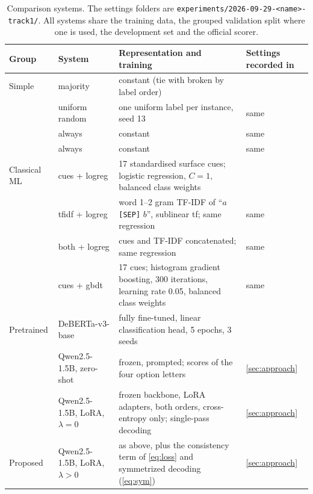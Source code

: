 \begin{table}[t]
\centering
\small
\begin{tabular}{@{}N{0.10\textwidth}N{0.19\textwidth}L{0.42\textwidth}N{0.20\textwidth}@{}}
\toprule
Group & System & Representation and training & Settings recorded in \\
\midrule
Simple & majority & constant \FW{} (tie with \BW{} broken by label order) &  \\
 & uniform random & one uniform label per instance, seed 13 & same \\
 & always \EQ{} & constant & same \\
 & always \NO{} & constant & same \\
\midrule
Classical ML & cues + logreg & 17 standardised surface cues; logistic regression, ${C = 1}$, balanced class weights &  \\
 & tfidf + logreg & word 1--2 gram TF-IDF of ``$a$ \texttt{[SEP]} $b$'', sublinear tf; same regression & same \\
 & both + logreg & cues and TF-IDF concatenated; same regression & same \\
 & cues + gbdt & 17 cues; histogram gradient boosting, 300 iterations, learning rate 0.05, balanced class weights & same \\
\midrule
Pretrained & DeBERTa-v3-base & fully fine-tuned, linear classification head, 5 epochs, 3 seeds &  \\
 & Qwen2.5-1.5B, zero-shot & frozen, prompted; scores of the four option letters & \cref{sec:approach} \\
 & Qwen2.5-1.5B, LoRA, ${\lambda = 0}$ & frozen backbone, LoRA adapters, both orders, cross-entropy only; single-pass decoding & \cref{sec:approach} \\
\midrule
Proposed & Qwen2.5-1.5B, LoRA, ${\lambda > 0}$ & as above, plus the consistency term of \cref{eq:loss} and symmetrized decoding (\cref{eq:sym}) & \cref{sec:approach} \\
\bottomrule
\end{tabular}
\caption{Comparison systems. The settings folders are \texttt{experiments/2026-09-29-<name>-track1/}. All systems share the training data, the grouped validation split where one is used, the development set and the official scorer.}
\label{tab:comparison}
\end{table}
